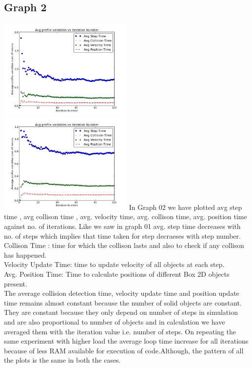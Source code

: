 \documentclass[11pt]{article}
\begin{document}
\subsection{Graph 2}
 \includegraphics[width=0.5\textwidth,keepaspectratio]{img/g08_plot02_low} \includegraphics[width=0.5\textwidth,keepaspectratio]{img/g08_plot02_high}
In Graph 02 we have plotted avg step time , avg collison time , avg. velocity time, avg. collison time, avg. position time against no. of iterations.
Like we saw in graph 01 avg. step time decreases with no. of steps which implies that time taken for step decraeses with step number.\\
Collison Time : time for which the collison lasts and also to check if any collison has happened.\\
Velocity Update Time: time to update velocity of all objects at each step.\\
Avg. Position Time: Time to calculate positions of different Box 2D objects present.\\ 
The average collision detection time, velocity update time and position update time remains almost constant because the number of solid objects are constant. They are constant because they only depend on number of steps in simulation and are also proportional to number of objects and in calculation we have averaged them with the iteration value i.e. number of steps.
On repeating the same experiment with higher load the average loop time increase for all iterations because of less RAM available for execution of code.Although, the pattern of all the plots is the same in both the cases.\\
\end{document}
